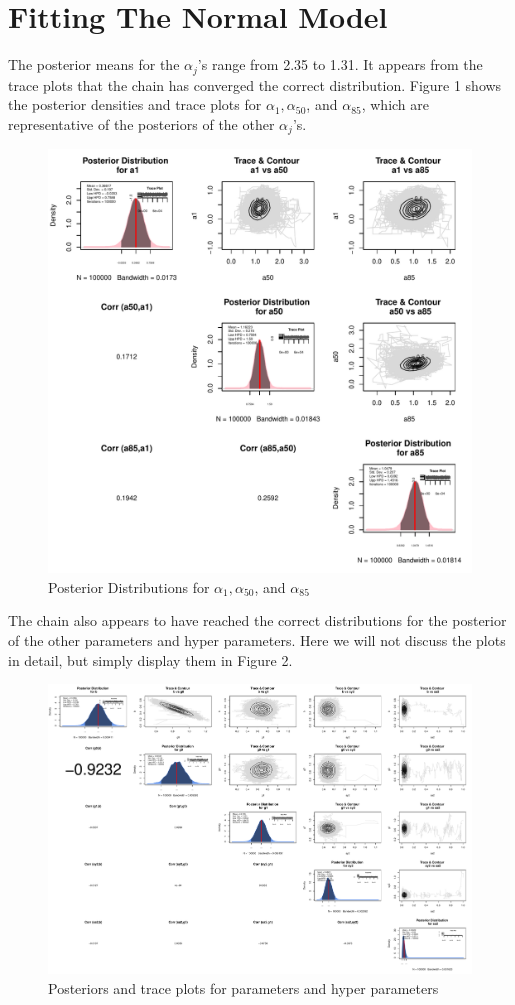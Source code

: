 \documentclass{article}
\def\beginmyfig{\begin{figure}[htbp]\begin{center}}
\def\endmyfig{\end{center}\end{figure}}
\begin{document}
\section{Fitting The Normal Model}
The posterior means for the $\alpha_j$'s range from 2.35 to 1.31. It appears from the trace
plots that the chain has converged the correct distribution. Figure 1 shows the posterior
densities and trace plots for $\alpha_1,\alpha_{50}$, and $\alpha_{85}$, which are representative
of the posteriors of the other $\alpha_j$'s.\\
\beginmyfig \includegraphics[scale=.5]{images/apost.pdf} 
            \caption{Posterior Distributions for $\alpha_1,\alpha_{50}$, and $\alpha_{85}$} \endmyfig 

\noindent
The chain also appears to have reached the correct distributions for the posterior of the other parameters
and hyper parameters. Here we will not discuss the plots in detail, but simply display them in Figure 2.\\
\beginmyfig \includegraphics[scale=.3]{images/hyperPost.pdf} 
            \caption{Posteriors and trace plots for parameters and hyper parameters}\endmyfig 
\end{document}
